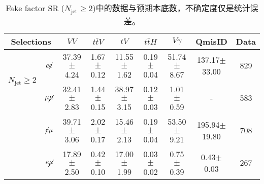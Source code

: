 \begin{table}[!ht]
\begin{center}
\scriptsize
\begin{tabular}{c|c|cccc|c|c|c}
\hline
\hline
\multicolumn{2}{c|}{ Selections}                      &$VV$  &$t\bar{t}V$    &$tV$    &$t\bar{t}H$     &$V\gamma$  &QmisID  &Data \\
\hline
\multirow{2}{*}{$N_{\text{jet}} \geq 2$}  &$e\cancel{e}$ &37.39$\pm$4.24  &1.67 $\pm$ 0.12  &11.55 $\pm$ 1.62  &0.19 $\pm$ 0.04  &51.74 $\pm$ 8.67  &137.17$\pm$33.00  &829 \\ 
\cline{2-9}
                                       &$\mu\cancel{\mu}$ &32.41$\pm$2.83    &1.44$\pm$0.15    &38.97$\pm$3.15    &0.12$\pm$0.03    &1.01$\pm$0.59    &-    &583 \\ 
\cline{2-9}
                                       &$\cancel{e}\mu$ &39.71$\pm$3.06  &2.02 $\pm$ 0.17  &15.46 $\pm$ 2.13  &0.19 $\pm$ 0.04  &53.50 $\pm$ 9.21  &195.94$\pm$19.80  &708 \\ 
\cline{2-9}
                                       &$e\cancel{\mu}$ &17.89$\pm$2.50  &0.42 $\pm$ 0.10  &17.00 $\pm$ 1.99  &0.03 $\pm$ 0.02  &0.75 $\pm$ 0.39  &0.43$\pm$0.03  &267 \\ 
\hline
\hline
\end{tabular}
\caption{Fake factor SR ($N_{\text{jet}} \geq 2$)中的数据与预期本底数，不确定度仅是统计误差。}
\label{tab:low_Njet_CR_eventyield}
\end{center}
\end{table}
